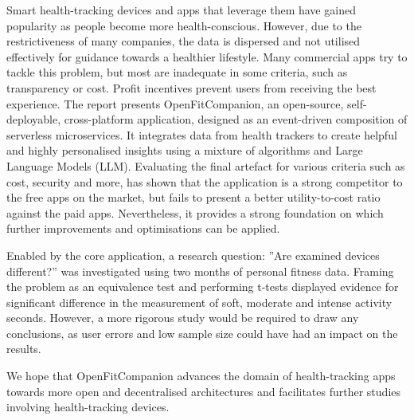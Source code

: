 %
{\singlespacing
Smart health-tracking devices and apps that leverage them have gained popularity as people become more health-conscious. However, due to the restrictiveness of many companies, the data is dispersed and not utilised effectively for guidance towards a healthier lifestyle. Many commercial apps try to tackle this problem, but most are inadequate in some criteria, such as transparency or cost. Profit incentives prevent users from receiving the best experience. The report presents OpenFitCompanion, an open-source, self-deployable, cross-platform application, designed as an event-driven composition of serverless microservices. It integrates data from health trackers to create helpful and highly personalised insights using a mixture of algorithms and Large Language Models (LLM). Evaluating the final artefact for various criteria such as cost, security and more, has shown that the application is a strong competitor to the free apps on the market, but fails to present a better utility-to-cost ratio against the paid apps. Nevertheless, it provides a strong foundation on which further improvements and optimisations can be applied. 

Enabled by the core application, a research question: ”Are examined devices different?” was investigated using two months of personal fitness data. Framing the problem as an equivalence test and performing t-tests displayed evidence for significant difference in the measurement of soft, moderate and intense activity seconds. However, a more rigorous study would be required to draw any conclusions, as user errors and low sample size could have had an impact on the results. 

We hope that OpenFitCompanion advances the domain of health-tracking apps towards more open and decentralised architectures and facilitates further studies involving health-tracking devices. 
}

